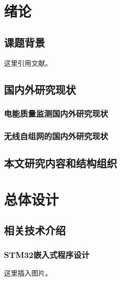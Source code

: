 \documentclass[UTF8，a4paper]{ctexrep}
\begin{document}
\clearpage
{}

\songti
\chapter{绪论}{\heiti{}}
\thispagestyle{fancy}

  \section{课题背景}
  这里引用文献\cite{REF_13浅探应急通信保障中无线自组网技术的应用}。
  \section{国内外研究现状}
    \subsection{电能质量监测国内外研究现状}
    \subsection{无线自组网的国内外研究现状}
    \thispagestyle{fancy}

  \section{本文研究内容和结构组织}

\clearpage
\chapter{总体设计}{\heiti{}}
\thispagestyle{fancy}
\section{相关技术介绍}
  \subsection{STM32嵌入式程序设计}
  这里插入图片。
\end{document}
